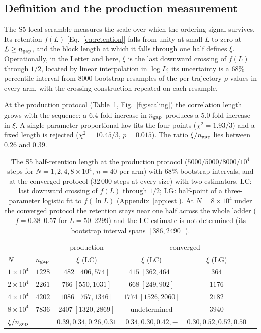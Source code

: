 \documentclass[reprint,amsmath,amssymb,aps,pre,longbibliography]{revtex4-2}
\begin{document}
\subsection{Definition and the production measurement}

The S5 local scramble measures the scale over which the ordering signal survives. Its
retention $f(L)$ [Eq.~\eqref{eq:retention}] falls from unity at small $L$ to zero at
$L\ge n_{\rm gap}$, and the block length at which it falls through one half defines $\xi$.
Operationally, in the Letter and here, $\xi$ is the last downward crossing of $f(L)$ through
$1/2$, located by linear interpolation in $\log L$; its uncertainty is a $68\%$ percentile
interval from $8000$ bootstrap resamples of the per-trajectory $\rho$ values in every arm,
with the crossing construction repeated on each resample.

At the production protocol (Table~\ref{tab:xi}, Fig.~\ref{fig:scaling}) the correlation
length grows with the sequence: a $6.4$-fold increase in $n_{\rm gap}$ produces a $5.0$-fold
increase in $\xi$. A single-parameter proportional law fits the four points
($\chi^{2}=1.93/3$) and a fixed length is rejected ($\chi^{2}=10.45/3$, $p=0.015$). The
ratio $\xi/n_{\rm gap}$ lies between $0.26$ and $0.39$.

\begin{table}[t]
\caption{The S5 half-retention length at the production protocol ($5000/5000/8000/10^{4}$
steps for $N=1,2,4,8\times10^{4}$, $n=40$ per arm) with $68\%$ bootstrap intervals, and at
the converged protocol ($32\,000$ steps at every size) with two estimators. LC: last
downward crossing of $f(L)$ through $1/2$; LG: half-point of a three-parameter logistic fit
to $f(\ln L)$ (Appendix~\ref{app:est}). At $N=8\times10^{4}$ under the converged protocol
the retention stays near one half across the whole ladder ($f=0.38$--$0.57$ for
$L=50$--$2299$) and the LC estimate is not determined (its bootstrap interval spans
$[386,2490]$).}
\label{tab:xi}
\begin{ruledtabular}
\begin{tabular}{lccccc}
 & & \multicolumn{1}{c}{production} & \multicolumn{2}{c}{converged} \\
$N$ & $n_{\rm gap}$ & $\xi$ (LC) & $\xi$ (LC) & $\xi$ (LG) & \\ \hline
$1\times10^{4}$ & $1228$ & $482\ [406,574]$   & $415\ [362,464]$   & $364$  &\\
$2\times10^{4}$ & $2261$ & $766\ [550,1031]$  & $668\ [249,902]$   & $1176$ &\\
$4\times10^{4}$ & $4202$ & $1086\ [757,1346]$ & $1774\ [1526,2060]$& $2182$ &\\
$8\times10^{4}$ & $7836$ & $2407\ [1320,2869]$& undetermined       & $3940$ &\\ \hline
$\xi/n_{\rm gap}$ & & $0.39,0.34,0.26,0.31$ & $0.34,0.30,0.42,-$ & $0.30,0.52,0.52,0.50$ &\\
\end{tabular}
\end{ruledtabular}
\end{table}
\end{document}
